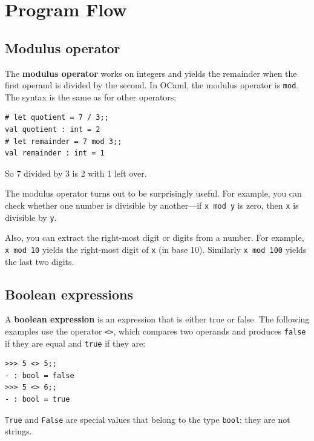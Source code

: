 \documentclass[10pt]{book}
\begin{document}


\chapter{Program Flow}

\section{Modulus operator}


The {\bf modulus operator} works on integers and yields the remainder
when the first operand is divided by the second.  In OCaml, the
modulus operator is {\tt mod}. The syntax is the same
as for other operators:

\beforeverb
\begin{verbatim}
# let quotient = 7 / 3;;
val quotient : int = 2
# let remainder = 7 mod 3;;
val remainder : int = 1
\end{verbatim}
\afterverb
%
So 7 divided by 3 is 2 with 1 left over.

The modulus operator turns out to be surprisingly useful.  For
example, you can check whether one number is divisible by another---if
{\tt x mod y} is zero, then {\tt x} is divisible by {\tt y}.


Also, you can extract the right-most digit
or digits from a number.  For example, {\tt x mod 10} yields the
right-most digit of {\tt x} (in base 10).  Similarly {\tt x mod 100}
yields the last two digits.


\section{Boolean expressions}

A {\bf boolean expression} is an expression that is either true
or false.  The following examples use the 
operator {\tt <>}, which compares two operands and produces
{\tt false} if they are equal and {\tt true} if they are:

\beforeverb
\begin{verbatim}
>>> 5 <> 5;;
- : bool = false
>>> 5 <> 6;;
- : bool = true
\end{verbatim}
\afterverb
%
{\tt True} and {\tt False} are special
values that belong to the type {\tt bool}; they are not strings.
\end{document}
